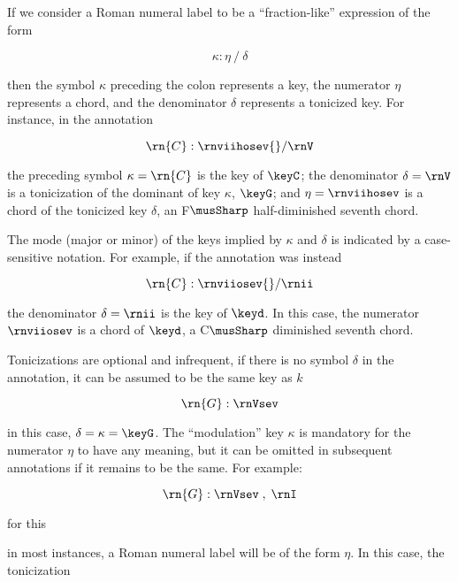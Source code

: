 
If we consider a Roman numeral label to be a
``fraction-like'' expression of the form

\begin{equation}
    \kappa : \eta \: / \: \delta
\end{equation}

then the symbol $\kappa$ preceding the colon represents a
key, the numerator $\eta$ represents a chord, and the
denominator $\delta$ represents a tonicized key. For
instance, in the annotation 

\begin{equation}
    \rn{C}:\rnviihosev{}/\rnV
\end{equation}

the preceding symbol $\kappa=\rn{C}$ is the key of $\keyC$;
the denominator $\delta = \rnV$ is a tonicization of the
dominant of key $\kappa$, $\keyG$; and $\eta=\rnviihosev$ is
a chord of the tonicized key $\delta$, an F$\musSharp$
half-diminished seventh chord.

The mode (major or minor) of the keys implied by $\kappa$
and $\delta$ is indicated by a case-sensitive notation. For
example, if the annotation was instead

\begin{equation}
    \rn{C}:\rnviiosev{}/\rnii
\end{equation}

the denominator $\delta=\rnii$ is the key of $\keyd$. In
this case, the numerator $\rnviiosev$ is a chord of $\keyd$,
a C$\musSharp$ diminished seventh chord.

Tonicizations are optional and infrequent, if there is no
symbol $\delta$ in the annotation, it can be assumed to be
the same key as $k$

\begin{equation}
    \rn{G}:\rnVsev
\end{equation}

in this case, $\delta = \kappa = \keyG$. The ``modulation''
key $\kappa$ is mandatory for the numerator $\eta$ to have
any meaning, but it can be omitted in subsequent annotations
if it remains to be the same. For example:

\begin{equation}
    \rn{G}:\rnVsev \;,\; \rnI
\end{equation}

for this 

in most instances, a Roman numeral label will be of the form
$\eta$. In this case, the tonicization 
